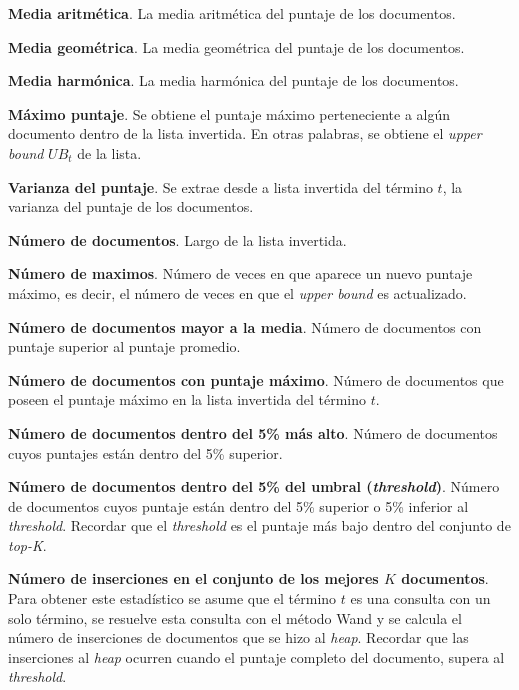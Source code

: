 \begin{list}{}{}
	\item \textbf{Media aritmética}. La media aritmética del puntaje de los documentos.

	\item \textbf{Media geométrica}. La media geométrica del puntaje de los documentos.

	\item \textbf{Media harmónica}.  La media harmónica del puntaje de los documentos. 

	\item \textbf{Máximo puntaje}. Se obtiene el puntaje máximo perteneciente a algún documento dentro de la lista invertida. En otras palabras, se obtiene el \textit{upper bound} $UB_t$ de la lista. 

	\item \textbf{Varianza del puntaje}. Se extrae desde a lista invertida del término $t$, la varianza del puntaje de los documentos. 
	
	\item \textbf{Número de documentos}. Largo de la lista invertida. 

	\item \textbf{Número de maximos}. Número de veces en que aparece un nuevo puntaje máximo, es decir, el número de veces en que el \textit{upper bound} es actualizado. 

	\item \textbf{Número de documentos mayor a la media}. Número de documentos con puntaje superior al puntaje promedio. 
	
	\item \textbf{Número de documentos con puntaje máximo}. Número de documentos que poseen el puntaje máximo en la lista invertida del término $t$. 
	
	\item \textbf{Número de documentos dentro del 5\% más alto}. Número de documentos cuyos puntajes están dentro del 5\% superior. 
	
	\item \textbf{Número de documentos dentro del 5\% del umbral (\textit{threshold})}. Número de documentos cuyos puntaje están dentro del 5\% superior o 5\% inferior al \textit{threshold}. Recordar que el \textit{threshold} es el puntaje más bajo dentro del conjunto de \textit{top-K}.
	
	\item \textbf{Número de inserciones en el conjunto de los mejores $K$ documentos}. Para obtener este estadístico se asume que el término $t$ es una consulta con un solo término, se resuelve esta consulta con el método Wand y se calcula el número de inserciones de documentos que se hizo al \textit{heap}. Recordar que las inserciones al \textit{heap} ocurren cuando el puntaje completo del documento, supera al \textit{threshold}.
	

\end{list}
